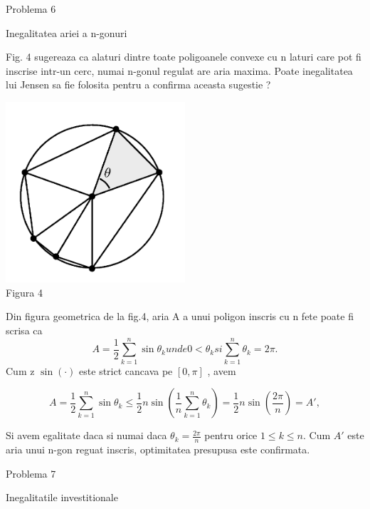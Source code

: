 \documentclass[a4paper,12pt,oneside]{report}
\begin{document}
Problema 6 

Inegalitatea ariei a n-gonuri

Fig. 4 sugereaza ca alaturi dintre toate poligoanele convexe cu n laturi care pot fi inscrise intr-un cerc, numai n-gonul regulat are aria maxima. Poate inegalitatea lui Jensen sa fie folosita pentru a confirma aceasta sugestie ?

\begin{center}
	\includegraphics[width=0.5\textwidth]{fig_pb6.png}
	\\ Figura 4
\end{center}

Din figura geometrica de la fig.4, aria A a unui poligon inscris cu n fete poate fi scrisa ca 
\begin{displaymath}
  A = \frac{1}{2}\sum_{k = 1}^{n} \sin \theta _{k} unde 0< \theta _{k} si \sum_{k = 1}^n{\theta _{k}} = 2\pi. 
\end{displaymath}
	Cum z \(\sin \left ( \cdot  \right )\) este strict cancava pe \(\left [ 0 , \pi  \right ]\) , avem 

\begin{displaymath}
  A = \frac{1}{2}\sum_{k = 1}^{n} \sin \theta _{k}  \leq \frac{1}{2}n\sin\left ( \frac{1}{n}\sum_{k = 1}^{n}\theta _{k} \right ) = \frac{1}{2}n\sin \left ( \frac{2\pi }{n} \right ) = {A}',
\end{displaymath}

Si avem egalitate daca si numai daca \(\theta _{k} = \frac{2\pi }{n}\) pentru orice \(1\leq k\leq n\). Cum \({A}'\) este aria unui n-gon reguat inscris, optimitatea presupusa este confirmata. 


Problema 7

Inegalitatile investitionale 
\end{document}
